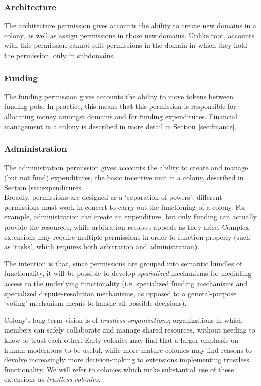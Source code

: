\subsubsection*{Architecture}

The architecture permission gives accounts the ability to create new domains in a colony, as well as assign permissions in those new domains. Unlike root, accounts with this permission cannot edit permissions in the domain in which they hold the permission, only in subdomains.

\subsubsection*{Funding}

The funding permission gives accounts the ability to move tokens between funding pots. In practice, this means that this permission is responsible for allocating money amongst domains and for funding expenditures. Financial management in a colony is described in more detail in Section \ref{sec:finance}.

\subsubsection*{Administration}

The administration permission gives accounts the ability to create and manage (but not fund) expenditures, the basic incentive unit in a colony, described in Section \ref{sec:expenditures}. \\

Broadly, permissions are designed as a `separation of powers': different permissions must work in concert to carry out the functioning of a colony. For example, administration can create an expenditure, but only funding can actually provide the resources, while arbitration resolves appeals as they arise. Complex extensions may require multiple permissions in order to function properly (such as `tasks', which requires both arbitration and administration).

The intention is that, since permissions are grouped into semantic bundles of functionality, it will be possible to develop \textit{specialized} mechanisms for mediating access to the underlying functionality (i.e. specialized funding mechanisms and specialized dispute-resolution mechanisms, as opposed to a general-purpose `voting' mechanism meant to handle all possible decisions).

Colony's long-term vision is of \textit{trustless organizations}; organizations in which members can safely collaborate and manage shared resources, without needing to know or trust each other. Early colonies may find that a larger emphasis on human moderators to be useful, while more mature colonies may find reasons to devolve increasingly more decision-making to extensions implementing trustless functionality. We will refer to colonies which make substantial use of these extensions as \textit{trustless colonies}.

